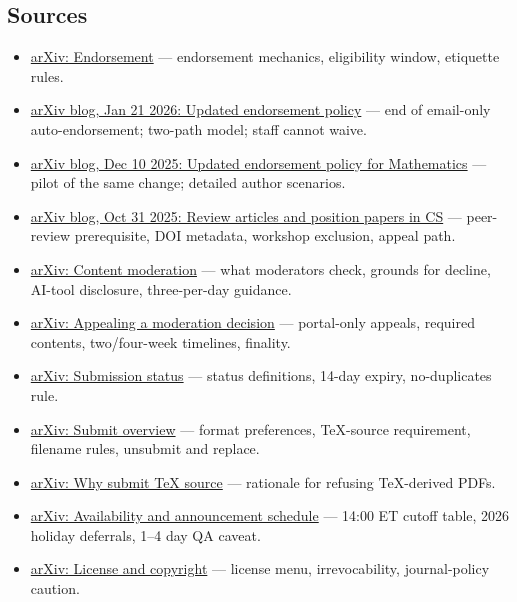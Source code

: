 \documentclass[twocolumn,10pt,letterpaper]{article}
\begin{document}
\subsection{Sources}

\begin{itemize}
\setlength{\itemsep}{0pt}
\setlength{\parskip}{0pt}
  \item \href{https://info.arxiv.org/help/endorsement.html}{arXiv: Endorsement} — endorsement mechanics, eligibility window, etiquette rules.
  \item \href{https://blog.arxiv.org/2026/01/21/attention-authors-updated-endorsement-policy/}{arXiv blog, Jan 21 2026: Updated endorsement policy} — end of email-only auto-endorsement; two-path model; staff cannot waive.
  \item \href{https://blog.arxiv.org/2025/12/10/updated-endorsement-policy-for-arxiv-mathematics/}{arXiv blog, Dec 10 2025: Updated endorsement policy for Mathematics} — pilot of the same change; detailed author scenarios.
  \item \href{https://blog.arxiv.org/2025/10/31/attention-authors-updated-practice-for-review-articles-and-position-papers-in-arxiv-cs-category/}{arXiv blog, Oct 31 2025: Review articles and position papers in CS} — peer-review prerequisite, DOI metadata, workshop exclusion, appeal path.
  \item \href{https://info.arxiv.org/help/moderation/index.html}{arXiv: Content moderation} — what moderators check, grounds for decline, AI-tool disclosure, three-per-day guidance.
  \item \href{https://info.arxiv.org/help/moderation/appeals.html}{arXiv: Appealing a moderation decision} — portal-only appeals, required contents, two/four-week timelines, finality.
  \item \href{https://info.arxiv.org/help/submit\_status.html}{arXiv: Submission status} — status definitions, 14-day expiry, no-duplicates rule.
  \item \href{https://info.arxiv.org/help/submit/index.html}{arXiv: Submit overview} — format preferences, TeX-source requirement, filename rules, unsubmit and replace.
  \item \href{https://info.arxiv.org/help/faq/whytex.html}{arXiv: Why submit TeX source} — rationale for refusing TeX-derived PDFs.
  \item \href{https://info.arxiv.org/help/availability.html}{arXiv: Availability and announcement schedule} — 14:00 ET cutoff table, 2026 holiday deferrals, 1–4 day QA caveat.
  \item \href{https://info.arxiv.org/help/license/index.html}{arXiv: License and copyright} — license menu, irrevocability, journal-policy caution.

\end{itemize}
\end{document}
